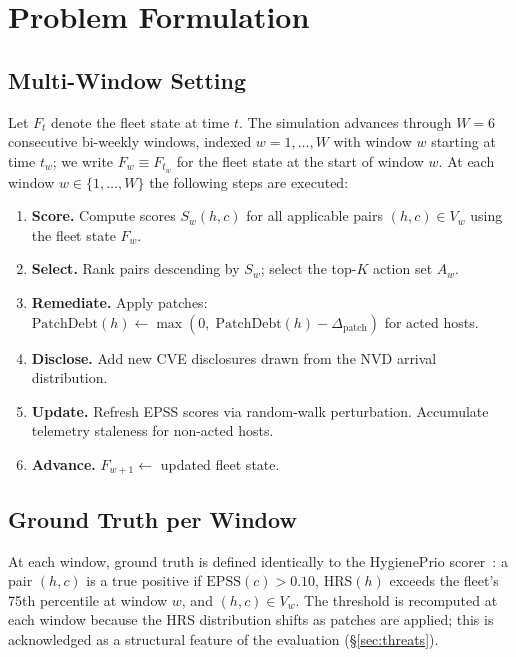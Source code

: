 \section{Problem Formulation}

\subsection{Multi-Window Setting}

Let $F_t$ denote the fleet state at time $t$. The simulation advances through $W = 6$ consecutive bi-weekly windows, indexed $w = 1, \ldots, W$ with window $w$ starting at time $t_w$; we write $F_w \equiv F_{t_w}$ for the fleet state at the start of window $w$. At each window $w \in \{1, \ldots, W\}$ the following steps are executed:

\begin{enumerate}
\item \textbf{Score.} Compute scores $S_w(h, c)$ for all applicable pairs $(h, c) \in V_w$ using the fleet state $F_w$.
\item \textbf{Select.} Rank pairs descending by $S_w$; select the top-$K$ action set $A_w$.
\item \textbf{Remediate.} Apply patches: $\mathrm{PatchDebt}(h) \leftarrow \max(0,\; \mathrm{PatchDebt}(h) - \Delta_{\mathrm{patch}})$ for acted hosts.
\item \textbf{Disclose.} Add new CVE disclosures drawn from the NVD arrival distribution.
\item \textbf{Update.} Refresh EPSS scores via random-walk perturbation. Accumulate telemetry staleness for non-acted hosts.
\item \textbf{Advance.} $F_{w+1} \leftarrow$ updated fleet state.
\end{enumerate}

\subsection{Ground Truth per Window}

At each window, ground truth is defined identically to the HygienePrio scorer~\cite{paper4hygieneprio}: a pair $(h, c)$ is a true positive if $\mathrm{EPSS}(c) > 0.10$, $\mathrm{HRS}(h)$ exceeds the fleet's 75th percentile at window $w$, and $(h, c) \in V_w$. The threshold is recomputed at each window because the HRS distribution shifts as patches are applied; this is acknowledged as a structural feature of the evaluation (\S\ref{sec:threats}).

